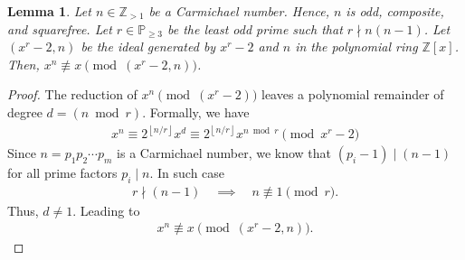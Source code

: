 \documentclass{article}
\theoremstyle{plain}
\newtheorem{lemma}[theorem]{Lemma}
\theoremstyle{definition}
\newcommand{\floor}[1]{\left\lfloor #1 \right\rfloor}
\newcommand{\Z}{\mathbb{Z}}
\begin{document}
\begin{lemma} \label{proof:carmichalenumberxnnotequalsx}
Let $n \in \Z_{>1}$ be a Carmichael number. Hence, $n$ is odd, composite, and squarefree. Let $r \in \mathbb{P}_{\geq 3}$ be the least odd prime such that $r \nmid n (n-1)$. Let $(x^r-2, n)$ be the ideal generated by $x^r-2$ and $n$ in the polynomial ring $\Z[x]$. Then, $x^n \not\equiv x \pmod{(x^r-2,n)}$.
\end{lemma}
\begin{proof}
The reduction of $x^n \pmod{(x^r-2)}$ leaves a polynomial remainder of degree $d = (n \bmod r)$. Formally, we have
\begin{align*}
    x^n \equiv 2^{\floor{n/r}} x^d \equiv 2^{\floor{n/r}} x^{n \bmod r} \pmod{x^r-2}
\end{align*}
Since $n = p_1 p_2 \cdots p_m$ is a Carmichael number, we know that $(p_i-1) \mid (n-1)$ for all prime factors $p_i \mid n$. In such case
\begin{align*}
    r \nmid (n-1) \quad \implies \quad n \not\equiv 1 \pmod{r} . 
\end{align*}
Thus, $d \not= 1$. Leading to
\begin{align*}
    x^n \not\equiv x \pmod{(x^r-2, n)} .
\end{align*}
\end{proof}
\end{document}
